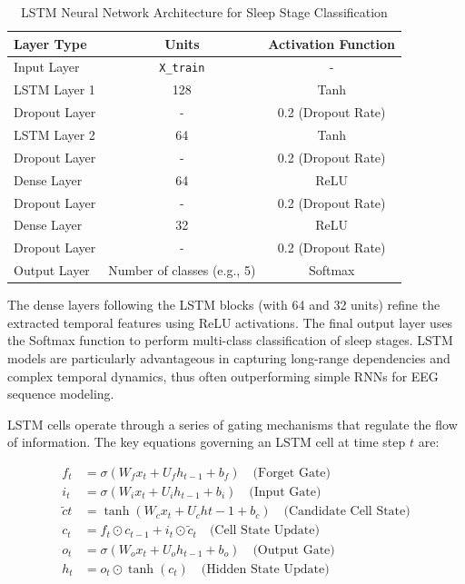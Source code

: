 \begin{table}[H]
	\centering
	\caption{LSTM Neural Network Architecture for Sleep Stage Classification}
	\label{tab:lstm_architecture}
	\begin{tabular}{lcc}
		\hline
		\textbf{Layer Type} & \textbf{Units} & \textbf{Activation Function} \\
		\hline
		Input Layer         & \texttt{X\_train}           & - \\
		LSTM Layer 1        & 128                         & Tanh \\
		Dropout Layer       & -                           & 0.2 (Dropout Rate) \\
		LSTM Layer 2        & 64                          & Tanh \\
		Dropout Layer       & -                           & 0.2 (Dropout Rate) \\
		Dense Layer         & 64                          & ReLU \\
		Dropout Layer       & -                           & 0.2 (Dropout Rate) \\
		Dense Layer         & 32                          & ReLU \\
		Dropout Layer       & -                           & 0.2 (Dropout Rate) \\
		Output Layer        & Number of classes (e.g., 5) & Softmax \\
		\hline
	\end{tabular}
\end{table}

The dense layers following the LSTM blocks (with 64 and 32 units) refine the extracted temporal features using ReLU activations. The final output layer uses the Softmax function to perform multi-class classification of sleep stages. LSTM models are particularly advantageous in capturing long-range dependencies and complex temporal dynamics, thus often outperforming simple RNNs for EEG sequence modeling.

LSTM cells operate through a series of gating mechanisms that regulate the flow of information. The key equations governing an LSTM cell at time step \( t \) are:

\begin{align}
	f_t &= \sigma(W_f x_t + U_f h_{t-1} + b_f) \quad \text{(Forget Gate)} \\
	i_t &= \sigma(W_i x_t + U_i h_{t-1} + b_i) \quad \text{(Input Gate)} \\
	\tilde{c}t &= \tanh(W_c x_t + U_c h{t-1} + b_c) \quad \text{(Candidate Cell State)} \\
	c_t &= f_t \odot c_{t-1} + i_t \odot \tilde{c}_t \quad \text{(Cell State Update)} \\
	o_t &= \sigma(W_o x_t + U_o h_{t-1} + b_o) \quad \text{(Output Gate)} \\
	h_t &= o_t \odot \tanh(c_t) \quad \text{(Hidden State Update)}
\end{align}

